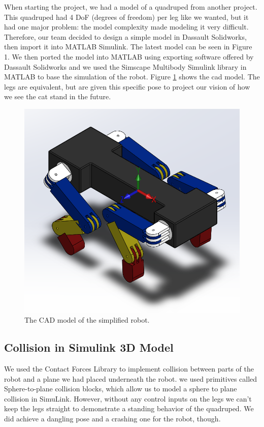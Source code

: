 When starting the project, we had a model of a quadruped from another project. This quadruped had 4 DoF (degrees of freedom) per leg like we wanted, but it had one major problem: the model complexity made modeling it very difficult. Therefore, our team decided to design a simple model in Dassault Solidworks, then import it into MATLAB Simulink. The latest model can be seen in Figure 1.
We then ported the model into MATLAB using exporting software offered by  Dassault Solidworks and we used the Simscape Multibody Simulink library in MATLAB to base the simulation of the robot.
Figure \ref{fig:cadmodel} shows the cad model. The legs are equivalent, but are given this specific pose to project our vision of how we see the cat stand in the future.
\begin{figure}[thpb]
    \parbox{\linewidth}{\includegraphics[width=\linewidth]{Figures/robot.png}}
    \caption{The CAD model of the simplified robot.}
    \label{fig:cadmodel}
\end{figure}

\subsection{Collision in Simulink 3D Model}
We used the Contact Forces Library to implement collision between parts of the robot and a plane we had placed underneath the robot. we used primitives called Sphere-to-plane collision blocks, which allow us to model a sphere to plane collision in SimuLink. However, without any control inputs on the legs we can't keep the legs straight to demonstrate a standing behavior of the quadruped. We did achieve a dangling pose and a crashing one for the robot, though.

